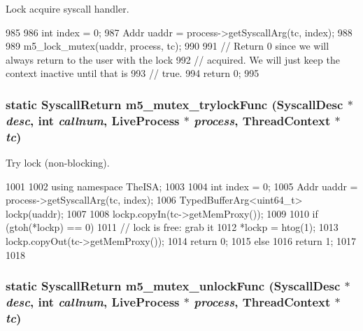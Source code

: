 Lock acquire syscall handler. 


\begin{DoxyCode}
985     {
986         int index = 0;
987         Addr uaddr = process->getSyscallArg(tc, index);
988 
989         m5_lock_mutex(uaddr, process, tc);
990 
991         // Return 0 since we will always return to the user with the lock
992         // acquired.  We will just keep the context inactive until that is
993         // true.
994         return 0;
995     }
\end{DoxyCode}
\hypertarget{classTru64_aa8d051ea34736b976895f70df5f48b9d}{
\subsubsection[{m5\_\-mutex\_\-trylockFunc}]{\setlength{\rightskip}{0pt plus 5cm}static {\bf SyscallReturn} m5\_\-mutex\_\-trylockFunc ({\bf SyscallDesc} $\ast$ {\em desc}, \/  int {\em callnum}, \/  {\bf LiveProcess} $\ast$ {\em process}, \/  {\bf ThreadContext} $\ast$ {\em tc})}}
\label{classTru64_aa8d051ea34736b976895f70df5f48b9d}


Try lock (non-\/blocking). 


\begin{DoxyCode}
1001     {
1002         using namespace TheISA;
1003 
1004         int index = 0;
1005         Addr uaddr = process->getSyscallArg(tc, index);
1006         TypedBufferArg<uint64_t> lockp(uaddr);
1007 
1008         lockp.copyIn(tc->getMemProxy());
1009 
1010         if (gtoh(*lockp) == 0) {
1011             // lock is free: grab it
1012             *lockp = htog(1);
1013             lockp.copyOut(tc->getMemProxy());
1014             return 0;
1015         } else {
1016             return 1;
1017         }
1018     }
\end{DoxyCode}
\hypertarget{classTru64_a13ce77bfaa709faa1a3006cea0465959}{
\subsubsection[{m5\_\-mutex\_\-unlockFunc}]{\setlength{\rightskip}{0pt plus 5cm}static {\bf SyscallReturn} m5\_\-mutex\_\-unlockFunc ({\bf SyscallDesc} $\ast$ {\em desc}, \/  int {\em callnum}, \/  {\bf LiveProcess} $\ast$ {\em process}, \/  {\bf ThreadContext} $\ast$ {\em tc})}}
\label{classTru64_a13ce77bfaa709faa1a3006cea0465959}


